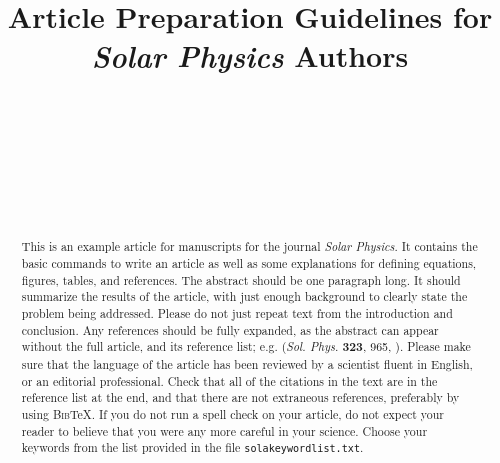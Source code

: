 \documentclass[namedreferences,hyperref,optionalrh]{spr-sola}
\newcommand{\BibTeX}{\textsc{Bib}\TeX}
\newcommand{\solphys}{{\it Sol. Phys.}}
\begin{document}
\begin{frontmatter}
\title{Article Preparation Guidelines for {\it Solar Physics} Authors}

\author[addressref={aff1,aff2,aff3},email={e-mail.a@mail.com}]{~}
\author[addressref=aff1,email={e-mail.b@mail.com}]{~}
\author[addressref=aff2,corref,email={e-mail.c@mail.com}]{~}
\author[addressref=aff3]{~}
\address[id=aff1]{First very very very very very very very very very
 very very very very very very very very very very very very very very very very very very long affiliation and address}
\address[id=aff2]{Institution, City, State, Country}
\address[id=aff3]{Third affiliation and address}


\begin{abstract}
This is an example article for manuscripts for the journal {\it Solar 
Physics}. It contains the basic commands to write an article as well 
as some explanations for defining equations, figures, tables,
and references.    
The abstract should be one paragraph long.  It should summarize
the results of the article, with just enough background to clearly state the
problem being addressed.
Please do not just repeat text from the introduction and conclusion.
Any references should be fully expanded, as the abstract can appear 
without the full article, and its reference list; 
e.g. \citeauthor{Dupont07} (\solphys{} \textbf{323}, 965, 
\citeyear{Dupont07}).
Please make sure that the language of the article has been reviewed by a
scientist fluent in English, or an editorial professional.
Check that all of the citations in the text are in the reference list at the
end, and that there are not extraneous references, preferably by using 
\BibTeX . If you do not run a spell check on your article, do not expect 
your reader to believe that you were any more careful in your science. 
Choose your keywords from the list provided in the file 
\texttt{sola\us keyword\us list.txt}.  
\end{abstract}
\end{frontmatter}
\end{document}
